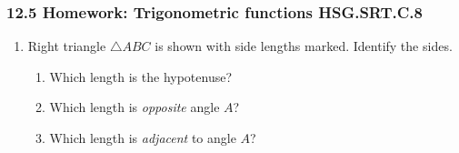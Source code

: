 

\fancyhead[LE]{\thepage}



\subsubsection*{12.5 Homework: Trigonometric functions \hfill HSG.SRT.C.8}
\begin{enumerate}
\item Right triangle $\triangle ABC$ is shown with side lengths marked. Identify the sides. \vspace{0.5cm}
\begin{multicols}{2}
  \begin{enumerate} [itemsep=1cm]
    \item Which length is the hypotenuse?
    \item Which length is \emph{opposite} angle $A$?
    \item Which length is \emph{adjacent} to angle $A$?
  \end{enumerate}
\begin{flushright}
\end{flushright}
\end{multicols}  \vspace{1cm}


\end{enumerate}
